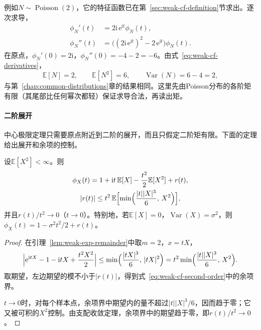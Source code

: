 例如$N\sim\operatorname{Poisson}(2)$，它的特征函数已在第~\ref{sec:weak-cf-definition}节求出。逐次求导，
\[
 \begin{aligned}
 \phi_N'(t)&=2\mathrm{i}\,\mathrm{e}^{\mathrm{i}t}\phi_N(t),\\
 \phi_N''(t)&=\bigl((2\mathrm{i}\,\mathrm{e}^{\mathrm{i}t})^{2}-2\,\mathrm{e}^{\mathrm{i}t}\bigr)\phi_N(t) .
 \end{aligned}
\]
在原点，$\phi_N'(0)=2\mathrm{i}$，$\phi_N''(0)=-4-2=-6$。由式~\eqref{eq:weak-cf-derivatives}，
\[
 \mathbb{E}[N]=2,\qquad\mathbb{E}[N^{2}]=6,\qquad\operatorname{Var}(N)=6-4=2 ,
\]
与第~\ref{chap:common-distributions}章的结果相同。这里先由Poisson分布的各阶矩有限（其尾部比任何幂次都轻）保证求导合法，再读出矩。

\paragraph{二阶展开}
中心极限定理只需要原点附近到二阶的展开，而且只假定二阶矩有限。下面的定理给出展开和余项的控制。

\begin{theorem}[特征函数的二阶展开]
\label{thm:weak-cf-second-order}
设$\mathbb{E}[X^{2}]<\infty$。则
\begin{equation}
 \begin{gathered}
 \phi_X(t)=1+\mathrm{i}t\,\mathbb{E}[X]-\frac{t^{2}}{2}\mathbb{E}[X^{2}]+r(t),\\
 \lvert r(t)\rvert\leq t^{2}\,\mathbb{E}\Bigl[\min\Bigl(\frac{\lvert t\rvert\lvert X\rvert^{3}}{6},\,X^{2}\Bigr)\Bigr] ,
 \end{gathered}
 \label{eq:weak-cf-second-order}
\end{equation}
并且$r(t)/t^{2}\to0$（$t\to0$）。特别地，若$\mathbb{E}[X]=0$，$\operatorname{Var}(X)=\sigma^{2}$，则$\phi_X(t)=1-\sigma^{2}t^{2}/2+r(t)$。
\end{theorem}

\begin{proof}
在引理~\ref{lem:weak-exp-remainder}中取$m=2$，$x=tX$，
\[
 \Bigl\lvert\mathrm{e}^{\mathrm{i}tX}-1-\mathrm{i}tX+\frac{t^{2}X^{2}}{2}\Bigr\rvert\leq\min\Bigl(\frac{\lvert tX\rvert^{3}}{6},\,\lvert tX\rvert^{2}\Bigr)=t^{2}\min\Bigl(\frac{\lvert t\rvert\lvert X\rvert^{3}}{6},\,X^{2}\Bigr) .
\]
取期望，左边期望的模不小于$\lvert r(t)\rvert$，得到式~\eqref{eq:weak-cf-second-order}中的余项界。

$t\to0$时，对每个样本点，余项界中期望内的量不超过$\lvert t\rvert\lvert X\rvert^{3}/6$，因而趋于零；它又被可积的$X^{2}$控制。由支配收敛定理，余项界中的期望趋于零，即$r(t)/t^{2}\to0$。
\end{proof}

